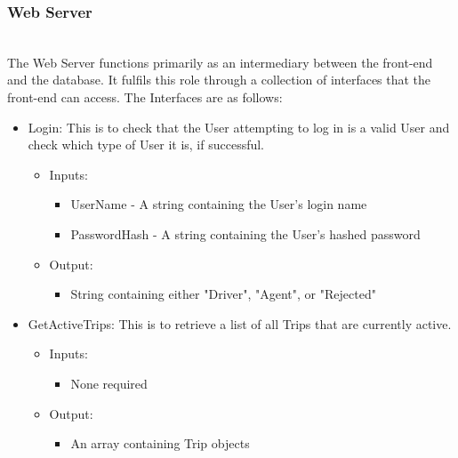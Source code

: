 \documentclass[10pt, onecolumn]{witseiepaper}
\begin{document}
\subsubsection{Web Server}\mbox{}\\
The Web Server functions primarily as an intermediary between the front-end and the database. It fulfils this role through a collection of interfaces that the front-end can access. The Interfaces are as follows:
\begin{itemize}
\item Login: This is to check that the User attempting to log in is a valid User and check which type of User it is, if successful.
	\begin{itemize}
	\item Inputs:
		\begin{itemize}
		\item UserName - A string containing the User's login name
		\item PasswordHash - A string containing the User's hashed password
		\end{itemize}
	\item Output:
		\begin{itemize}
		\item String containing either "Driver", "Agent", or "Rejected" 
		\end{itemize}
	\end{itemize}
\item GetActiveTrips: This is to retrieve a list of all Trips that are currently active.
	\begin{itemize}
	\item Inputs:
		\begin{itemize}
		\item None required
		\end{itemize}
	\item Output:
		\begin{itemize}
		\item An array containing Trip objects
		\end{itemize}
	\end{itemize}
	

\end{itemize}
\end{document}
